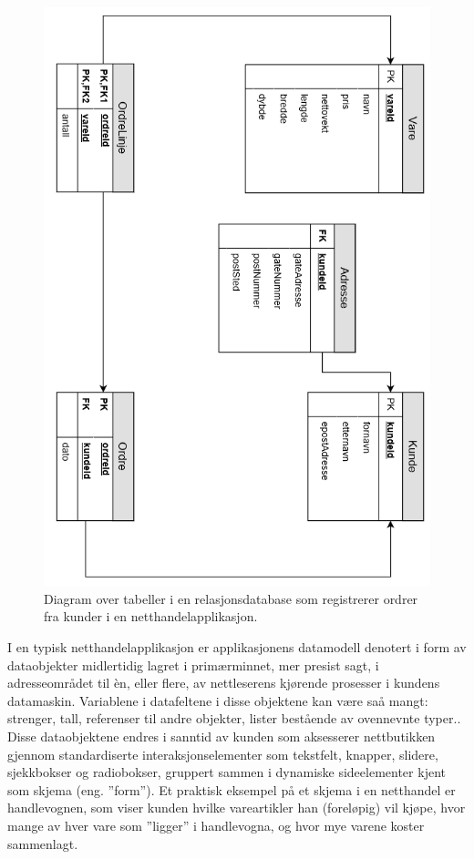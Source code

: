 \begin{figure}[h]
    \centering
    \includegraphics{fig/NettbutikkOrdreModell}
    \caption{Diagram over tabeller i en relasjonsdatabase som registrerer ordrer fra kunder i en netthandelapplikasjon.}
    \label{fig1}
\end{figure}
 
I en typisk netthandelapplikasjon er applikasjonens datamodell denotert i form av dataobjekter midlertidig lagret i primærminnet, mer presist sagt, i adresseområdet til èn, eller flere, av nettleserens kjørende prosesser i kundens datamaskin. Variablene i datafeltene i disse objektene kan være saå mangt: strenger, tall, referenser til andre objekter, lister bestående av ovennevnte typer.. Disse dataobjektene endres i sanntid av kunden som aksesserer nettbutikken gjennom standardiserte interaksjonselementer som tekstfelt, knapper, slidere, sjekkbokser og radiobokser, gruppert sammen i dynamiske sideelementer kjent som skjema (eng. ''form''). Et praktisk eksempel på et skjema i en netthandel er handlevognen, som viser kunden hvilke vareartikler han (foreløpig) vil kjøpe, hvor mange av hver vare som ''ligger'' i handlevogna, og hvor mye varene koster sammenlagt.

